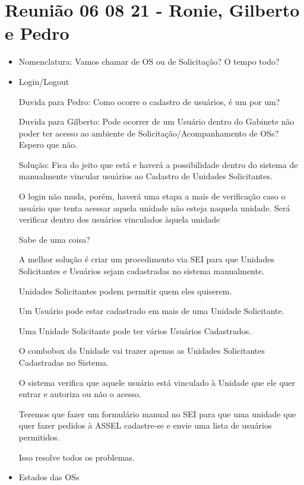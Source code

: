 \section{Reunião 06 08 21 - Ronie, Gilberto e Pedro}


\begin{itemize}

	
	\item \mschecksim Nomenclatura: Vamos chamar de OS ou de Solicitação? O tempo todo?
	
	\item \mschecksim Login/Logout
	
	
	Duvida para Pedro: Como ocorre o cadastro de usuários, é um por um?
	
	Duvida para Gilberto: Pode ocorrer de um Usuário dentro do Gabinete não poder ter acesso ao ambiente de Solicitação/Acompanhamento de OSs? Espero que não.

	Solução: Fica do jeito que está e haverá a possibilidade dentro do sistema de manualmente vincular usuários ao Cadastro de Unidades Solicitantes.

	O login não muda, porém, haverá uma etapa a mais de verificação caso o usuário que tenta acessar aquela unidade não esteja naquela unidade. Será verificar dentro dos usuários vinculados àquela unidade 

	Sabe de uma coisa?
	
	A melhor solução é criar um procedimento via SEI para que Unidades Solicitantes e Usuários sejam cadastradas no sistema manualmente.
	
	Unidades Solicitantes podem permitir quem eles quiserem.
	
	Um Usuário pode estar cadastrado em mais de uma Unidade Solicitante.
		
	Uma Unidade Solicitante pode ter vários Usuários Cadastrados.
	
	O combobox da Unidade vai trazer apenas as Unidades Solicitantes Cadastradas no Sistema.
	
	O sistema verifica que aquele usuário está vinculado à Unidade que ele quer entrar e autoriza ou não o acesso.
	
	Teremos que fazer um formulário manual no SEI para que uma unidade que quer fazer pedidos à ASSEL cadastre-se e envie uma lista de usuários permitidos.
	
	Isso resolve todos os problemas.
		
	
	\item \mschecksim Estados das OSs
	

\end{itemize}
